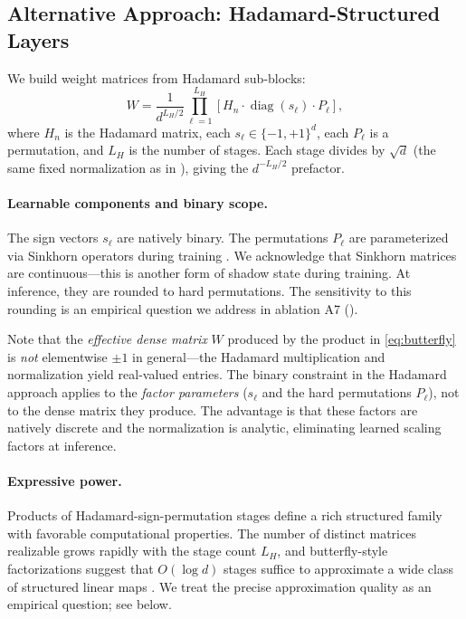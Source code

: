\documentclass[12pt,a4paper]{article}
\theoremstyle{plain}
\theoremstyle{definition}
\theoremstyle{remark}
\newcommand{\pmone}{\{-1,+1\}}
\begin{document}
\subsection{Alternative Approach: Hadamard-Structured Layers}\label{sec:hadamard-layers}

We build weight matrices from Hadamard sub-blocks:
\begin{equation}\label{eq:butterfly}
    W = \frac{1}{d^{L_H/2}} \prod_{\ell=1}^{L_H} \left[ H_n \cdot \operatorname{diag}(s_\ell) \cdot P_\ell \right],
\end{equation}
where $H_n$ is the Hadamard matrix, each $s_\ell \in \pmone^d$, each $P_\ell$ is a permutation, and $L_H$ is the number of stages. Each stage divides by $\sqrt{d}$ (the same fixed normalization as in ), giving the $d^{-L_H/2}$ prefactor.

\paragraph{Learnable components and binary scope.}
The sign vectors $s_\ell$ are natively binary. The permutations $P_\ell$ are parameterized via Sinkhorn operators during training \citep{mena2018learning}. We acknowledge that Sinkhorn matrices are continuous---this is another form of shadow state during training. At inference, they are rounded to hard permutations. The sensitivity to this rounding is an empirical question we address in ablation A7 ().

Note that the \emph{effective dense matrix} $W$ produced by the product in \eqref{eq:butterfly} is \emph{not} elementwise $\pm 1$ in general---the Hadamard multiplication and normalization yield real-valued entries. The binary constraint in the Hadamard approach applies to the \emph{factor parameters} ($s_\ell$ and the hard permutations $P_\ell$), not to the dense matrix they produce. The advantage is that these factors are natively discrete and the normalization is analytic, eliminating learned scaling factors at inference.

\paragraph{Expressive power.}
Products of Hadamard-sign-permutation stages define a rich structured family with favorable computational properties. The number of distinct matrices realizable grows rapidly with the stage count $L_H$, and butterfly-style factorizations suggest that $O(\log d)$ stages suffice to approximate a wide class of structured linear maps \citep{dao2022monarch}. We treat the precise approximation quality as an empirical question; see  below.
\end{document}
